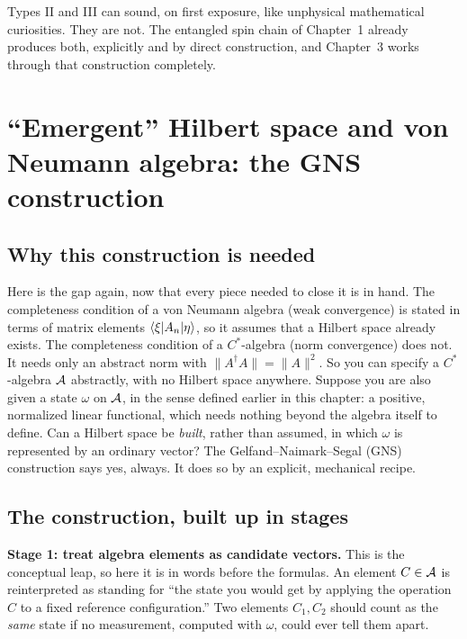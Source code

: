 Types II and III can sound, on first exposure, like unphysical mathematical curiosities. They are not. The
entangled spin chain of Chapter~1 already produces both, explicitly and by direct construction, and
Chapter~3 works through that construction completely.

\section{``Emergent'' Hilbert space and von Neumann algebra: the GNS construction}

\subsection*{Why this construction is needed}

Here is the gap again, now that every piece needed to close it is in hand. The completeness condition of a
von Neumann algebra (weak convergence) is stated in terms of matrix elements $\braket{\xi|A_n|\eta}$, so it
assumes that a Hilbert space already exists. The completeness condition of a $C^*$-algebra (norm
convergence) does not. It needs only an abstract norm with $\|A^\dagger A\|=\|A\|^2$. So you can specify a
$C^*$-algebra $\mathcal{A}$ abstractly, with no Hilbert space anywhere. Suppose you are also given a state $\omega$
on $\mathcal{A}$, in the sense defined earlier in this chapter: a positive, normalized linear functional, which needs
nothing beyond the algebra itself to define. Can a Hilbert space be \emph{built}, rather than assumed, in
which $\omega$ is represented by an ordinary vector? The Gelfand--Naimark--Segal (GNS) construction says yes,
always. It does so by an explicit, mechanical recipe.

\subsection*{The construction, built up in stages}

\textbf{Stage 1: treat algebra elements as candidate vectors.} This is the conceptual leap, so here it is in
words before the formulas. An element $C\in\mathcal{A}$ is reinterpreted as standing for ``the state you would get
by applying the operation $C$ to a fixed reference configuration.'' Two elements $C_1,C_2$ should count as
the \emph{same} state if no measurement, computed with $\omega$, could ever tell them apart.


